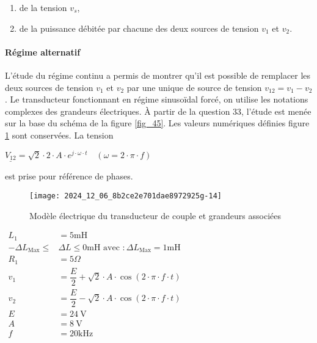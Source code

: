 \begin{enumerate}
  \item de la tension \(v_{s}\),
  \item de la puissance débitée par chacune des deux sources de tension \(v_{1}\) et \(v_{2}\).
\end{enumerate}
\ifprof
\begin{corrige}

\end{corrige}
\else
\fi

\paragraph*{Régime alternatif} L'étude du régime continu a permis de montrer qu'il est possible de remplacer les deux sources de tension \(v_{1}\) et \(v_{2}\) par une unique de source de tension \(v_{12}=v_{1}-v_{2}\). Le transducteur fonctionnant en régime sinusoïdal forcé, on utilise les notations complexes des grandeurs électriques. À partir de la question 33, l'étude est menée sur la base du schéma de la figure \ref{fig_45}. Les valeurs numériques définies figure \ref{fig_44} sont conservées. La tension

$
\underline{V_{12}}=\sqrt{2} \cdot 2 \cdot A \cdot e^{j \cdot \omega \cdot t} \quad(\omega=2 \cdot \pi \cdot f)
$

est prise pour référence de phases.\\

\begin{figure}[!htb]
\begin{center}
\texttt{[image: 2024\_12\_06\_8b2ce2e701dae8972925g-14]}
\caption{ Modèle électrique du transducteur de couple et grandeurs associées \label{fig_44}}
\end{center}
\end{figure}

$
\begin{aligned}
L_{1} & =5 \mathrm{mH} \\
-\Delta L_{\text{Max}} \leq & \Delta L \leq 0 \mathrm{mH} \text { avec }: \Delta L_{\text{Max}}=1 \mathrm{mH} \\
R_{1} & =5 \Omega \\
v_{1} & =\dfrac{E}{2}+\sqrt{2} \cdot A \cdot \cos (2 \cdot \pi \cdot f \cdot t) \\
v_{2} & =\dfrac{E}{2}-\sqrt{2} \cdot A \cdot \cos (2 \cdot \pi \cdot f \cdot t) \\
E & =24 \mathrm{~V} \\
A & =8 \mathrm{~V} \\
f & =20 \mathrm{kHz}
\end{aligned}
$

